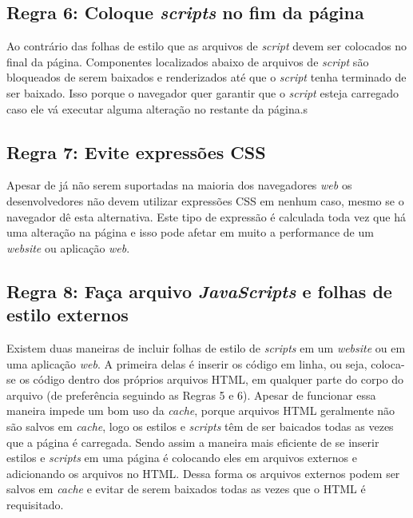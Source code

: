 \subsection{Regra 6: Coloque \textit{scripts} no fim da página}
\label{subsec:highperformance_regra6}
Ao contrário das folhas de estilo que as arquivos de \textit{script} devem ser colocados no final da página. Componentes localizados abaixo de arquivos de \textit{script} são bloqueados de serem baixados e renderizados até que o \textit{script} tenha terminado de ser baixado. Isso porque o navegador quer garantir que o \textit{script} esteja carregado caso ele vá executar alguma alteração no restante da página.s

\subsection{Regra 7: Evite expressões CSS}
\label{subsec:highperformance_regra7}
Apesar de já não serem suportadas na maioria dos navegadores \textit{web} os desenvolvedores não devem utilizar expressões CSS em nenhum caso, mesmo se o navegador dê esta alternativa. Este tipo de expressão é calculada toda vez que há uma alteração na página e isso pode afetar em muito a performance de um \textit{website} ou aplicação \textit{web}.

\subsection{Regra 8: Faça arquivo \textit{JavaScripts} e folhas de estilo externos}
\label{subsec:highperformance_regra8}
Existem duas maneiras de incluir folhas de estilo de \textit{scripts} em um \textit{website} ou em uma aplicação \textit{web}. A primeira delas é inserir os código em linha, ou seja, coloca-se os código dentro dos próprios arquivos HTML, em qualquer parte do corpo do arquivo (de preferência seguindo as Regras 5 e 6). Apesar de funcionar essa maneira impede um bom uso da \textit{cache}, porque arquivos HTML geralmente não são salvos em \textit{cache}, logo os estilos e \textit{scripts} têm de ser baicados todas as vezes que a página é carregada. Sendo assim a maneira mais eficiente de se inserir estilos e \textit{scripts} em uma página é colocando eles em arquivos externos e adicionando os arquivos no HTML. Dessa forma os arquivos externos podem ser salvos em \textit{cache} e evitar de serem baixados todas as vezes que o HTML é requisitado.

